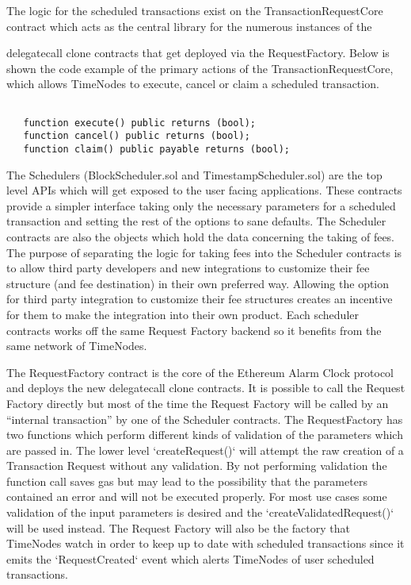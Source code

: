 \documentclass{article}
\begin{document}
  The logic for the scheduled transactions exist on the TransactionRequestCore contract which acts as the central library for the numerous instances of the {delegatecall clone contracts that get deployed via the RequestFactory. Below is shown the code example of the primary actions of the TransactionRequestCore, which allows TimeNodes to execute, cancel or claim a scheduled transaction.
  \begin{verbatim}
     
   function execute() public returns (bool);
   function cancel() public returns (bool);
   function claim() public payable returns (bool);

  \end{verbatim}

  The Schedulers (BlockScheduler.sol and TimestampScheduler.sol) are the top level APIs which will get exposed to the user facing applications. These contracts provide a simpler interface taking only the necessary parameters for a scheduled transaction and setting the rest of the options to sane defaults. The Scheduler contracts are also the objects which hold the data concerning the taking of fees. The purpose of separating the logic for taking fees into the Scheduler contracts is to allow third party developers and new integrations to customize their fee structure (and fee destination) in their own preferred way. Allowing the option for third party integration to customize their fee structures creates an incentive for them to make the integration into their own product. Each scheduler contracts works off the same Request Factory backend so it benefits from the same network of TimeNodes.
 
  The RequestFactory contract is the core of the Ethereum Alarm Clock protocol and deploys the new delegatecall clone contracts. It is possible to call the Request Factory directly but most of the time the Request Factory will be called by an “internal transaction” by one of the Scheduler contracts. The RequestFactory has two functions which perform different kinds of validation of the parameters which are passed in. The lower level `createRequest()` will attempt the raw creation of a Transaction Request without any validation. By not performing validation the function call saves gas but may lead to the possibility that the parameters contained an error and will not be executed properly. For most use cases some validation of the input parameters is desired and the `createValidatedRequest()` will be used instead. The Request Factory will also be the factory that TimeNodes watch in order to keep up to date with scheduled transactions since it emits the `RequestCreated` event which alerts TimeNodes of user scheduled transactions.
  
}
\end{document}
